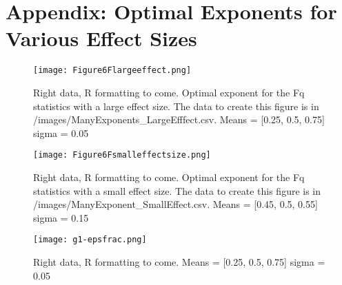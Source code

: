 \section{Appendix: Optimal Exponents for Various Effect Sizes}

\begin{figure}
\centering
\texttt{[image: Figure6Flargeeffect.png]}
\caption{Right data, R formatting to come. Optimal exponent for the Fq statistics with a large effect size. The data to create this figure is in /images/ManyExponents_LargeEfffect.csv. Means = [0.25, 0.5, 0.75] sigma = 0.05}
\end{figure}

\begin{figure}
\centering
\texttt{[image: Figure6Fsmalleffectsize.png]}
\caption{Right data, R formatting to come. Optimal exponent for the Fq statistics with a small effect size. The data to create this figure is in /images/ManyExponent_SmallEffect.csv. Means = [0.45, 0.5, 0.55] sigma = 0.15}
\end{figure}

\begin{figure}
\centering
\texttt{[image: g1-epsfrac.png]}
\caption{Right data, R formatting to come. Means = [0.25, 0.5, 0.75] sigma = 0.05}
\end{figure}

